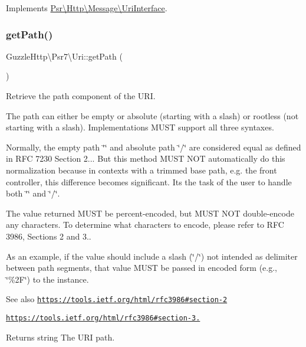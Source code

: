 Implements \hyperlink{interfacePsr_1_1Http_1_1Message_1_1UriInterface_a5dbe0ede7395fd19fca8fafe023aa285}{Psr\textbackslash{}\+Http\textbackslash{}\+Message\textbackslash{}\+Uri\+Interface}.

\mbox{\label{classGuzzleHttp_1_1Psr7_1_1Uri_a063016fa7af70993d74f3c4efa4e9246}} 
\subsubsection{\texorpdfstring{get\+Path()}{getPath()}}
{\footnotesize\ttfamily Guzzle\+Http\textbackslash{}\+Psr7\textbackslash{}\+Uri\+::get\+Path (\begin{DoxyParamCaption}{ }\end{DoxyParamCaption})}

Retrieve the path component of the U\+RI.

The path can either be empty or absolute (starting with a slash) or rootless (not starting with a slash). Implementations M\+U\+ST support all three syntaxes.

Normally, the empty path \char`\"{}\char`\"{} and absolute path \char`\"{}/\char`\"{} are considered equal as defined in R\+FC 7230 Section 2... But this method M\+U\+ST N\+OT automatically do this normalization because in contexts with a trimmed base path, e.\+g. the front controller, this difference becomes significant. It\textquotesingle{}s the task of the user to handle both \char`\"{}\char`\"{} and \char`\"{}/\char`\"{}.

The value returned M\+U\+ST be percent-\/encoded, but M\+U\+ST N\+OT double-\/encode any characters. To determine what characters to encode, please refer to R\+FC 3986, Sections 2 and 3..

As an example, if the value should include a slash (\char`\"{}/\char`\"{}) not intended as delimiter between path segments, that value M\+U\+ST be passed in encoded form (e.\+g., \char`\"{}\%2\+F\char`\"{}) to the instance.

\begin{DoxySeeAlso}{See also}
\href{https://tools.ietf.org/html/rfc3986#section-2}{\tt https\+://tools.\+ietf.\+org/html/rfc3986\#section-\/2} 

\href{https://tools.ietf.org/html/rfc3986#section-3.3}{\tt https\+://tools.\+ietf.\+org/html/rfc3986\#section-\/3.} 
\end{DoxySeeAlso}
\begin{DoxyReturn}{Returns}
string The U\+RI path. 
\end{DoxyReturn}


